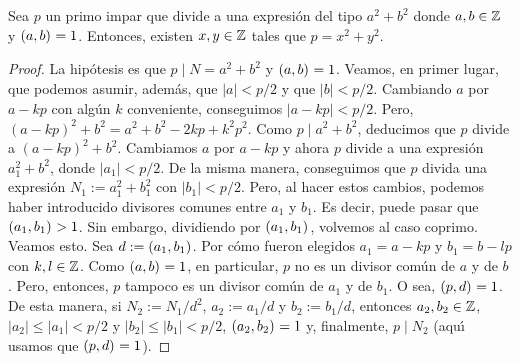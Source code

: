 \begin{lemaFermat}[Descenso]\label{lema:fermat:descenso}
	Sea $p$ un primo impar que divide a una expresi\'on del tipo $a^2+b^2$
	donde $a,b\in\mathbb{Z}$ y $\left({a,b}\right)_{}=1$. Entonces, existen
	$x,y\in\mathbb{Z}$ tales que $p=x^2+y^2$.
\end{lemaFermat}

\begin{proof}
	La hip\'otesis es que $p\mid N=a^2+b^2$ y $\left({a,b}\right)_{}=1$.
	Veamos, en primer lugar, que podemos asumir, adem\'as, que $|a|<p/2$
	y que $|b|<p/2$.
	Cambiando $a$ por $a-kp$ con alg\'un $k$ conveniente, conseguimos
	$|a-kp|<p/2$. Pero, $(a-kp)^2+b^2=a^2+b^2-2kp+k^2p^2$. Como
	$p\mid a^2+b^2$, deducimos que $p$ divide a $(a-kp)^2+b^2$. Cambiamos
	$a$ por $a-kp$ y ahora $p$ divide a una expresi\'on $a_1^2+b^2$, donde
	$|a_1|<p/2$.
	De la misma manera, conseguimos que $p$ divida una expresi\'on
	$N_1:=a_1^2+b_1^2$ con $|b_1|<p/2$.
	Pero, al hacer estos cambios, podemos haber introducido divisores
	comunes entre $a_1$ y $b_1$. Es decir, puede pasar que
	$\left({a_1,b_1}\right)_{}>1$.
	Sin embargo, dividiendo por $\left({a_1,b_1}\right)_{}$, volvemos al caso
	coprimo. Veamos esto. Sea $d:=\left({a_1,b_1}\right)_{}$. Por c\'omo fueron
	elegidos $a_1=a-kp$ y $b_1=b-lp$ con $k,l\in\mathbb{Z}$. Como
	$\left({a,b}\right)_{}=1$, en particular, $p$ no es un divisor com\'un de $a$ y
	de $b$. Pero, entonces, $p$ tampoco es un divisor com\'un de $a_1$ y
	de $b_1$. O sea, $\left({p,d}\right)_{}=1$. De esta manera, si $N_2:=N_1/d^2$,
	$a_2:=a_1/d$ y $b_2:=b_1/d$, entonces $a_2,b_2\in\mathbb{Z}$,
	$|a_2|\leq |a_1|<p/2$ y $|b_2|\leq |b_1|<p/2$, $\left({a_2,b_2}\right)_{}=1$ y,
	finalmente, $p\mid N_2$ (aqu\'{\i} usamos que $\left({p,d}\right)_{}=1$).


\end{proof}

